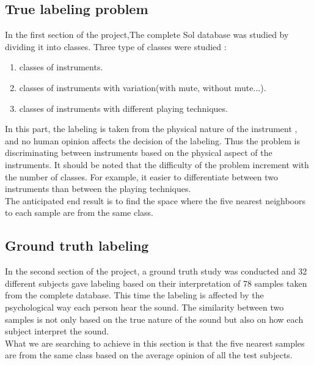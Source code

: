 \documentclass[hidelinks,12pt]{report}
\begin{document}
\subsection{True labeling problem}
In the first section of the project,The complete Sol database was studied by dividing it into classes. Three type of classes were studied :
\begin{enumerate}
\item classes of instruments.
\item classes of instruments with variation(with mute, without mute...).
\item classes of instruments with different playing techniques.
\end{enumerate}
In this part, the labeling is taken from the physical nature of the instrument , and no human opinion affects the decision of the labeling. Thus the problem is discriminating between instruments based on the physical aspect of the instruments. It should be noted that the difficulty of the problem increment with the number of classes. For example, it easier to differentiate between two instruments than between the playing techniques.\\ The anticipated end result is to find the space where the five nearest neighboors to each sample are from the same class.

\subsection{Ground truth labeling}
In the second section of the project, a ground truth study was conducted and 32 different subjects gave labeling based on their interpretation of 78 samples taken from the complete database. This time the labeling is affected by the psychological way each person hear the sound. The similarity between two samples is not only based on the true nature of the sound but also on how each subject interpret the sound.\\ What we are searching to achieve in this section is that the five nearest samples are from the same class based on the average opinion of all the test subjects.
\end{document}
